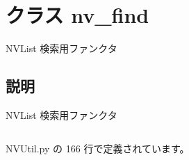 \section{クラス nv\_\-find}
\label{classsource__py_1_1_n_v_util_1_1nv__find}
NVList 検索用ファンクタ  




\subsection{説明}
NVList 検索用ファンクタ 



\footnotesize\begin{verbatim}
\end{verbatim}
\normalsize
 

 NVUtil.py の 166 行で定義されています。